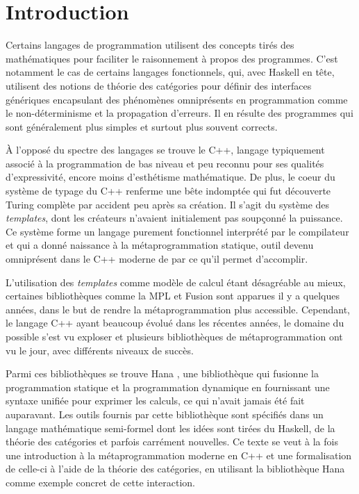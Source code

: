 \section{Introduction}
Certains langages de programmation utilisent des concepts tirés des
mathématiques pour faciliter le raisonnement à propos des programmes.
C'est notamment le cas de certains langages fonctionnels, qui, avec
Haskell en tête, utilisent des notions de théorie des catégories pour
définir des interfaces génériques encapsulant des phénomènes omniprésents
en programmation comme le non-déterminisme et la propagation d'erreurs.
Il en résulte des programmes qui sont généralement plus simples et surtout
plus souvent corrects.

À l'opposé du spectre des langages se trouve le C++, langage typiquement
associé à la programmation de bas niveau et peu reconnu pour ses qualités
d'expressivité, encore moins d'esthétisme mathématique. De plus, le coeur
du système de typage du C++ renferme une bête indomptée qui fut découverte
Turing complète par accident peu après sa création. Il s'agit du système des
\textit{templates}, dont les créateurs n'avaient initialement pas soupçonné
la puissance. Ce système forme un langage purement fonctionnel interprété par
le compilateur et qui a donné naissance à la métaprogrammation statique, outil
devenu omniprésent dans le C++ moderne de par ce qu'il permet d'accomplir.

L'utilisation des \textit{templates} comme modèle de calcul étant désagréable
au mieux, certaines bibliothèques comme la MPL \cite{mpl} et Fusion \cite{fusion}
sont apparues il y a quelques années, dans le but de rendre la métaprogrammation
plus accessible. Cependant, le langage C++ ayant beaucoup évolué dans les récentes
années, le domaine du possible s'est vu exploser et plusieurs bibliothèques de
métaprogrammation ont vu le jour, avec différents niveaux de succès.

Parmi ces bibliothèques se trouve Hana \cite{hana}, une bibliothèque qui
fusionne la programmation statique et la programmation dynamique en fournissant
une syntaxe unifiée pour exprimer les calculs, ce qui n'avait jamais été fait
auparavant. Les outils fournis par cette bibliothèque sont spécifiés dans
un langage mathématique semi-formel dont les idées sont tirées du Haskell,
de la théorie des catégories et parfois carrément nouvelles. Ce texte se
veut à la fois une introduction à la métaprogrammation moderne en C++ et
une formalisation de celle-ci à l'aide de la théorie des catégories, en
utilisant la bibliothèque Hana comme exemple concret de cette interaction.
